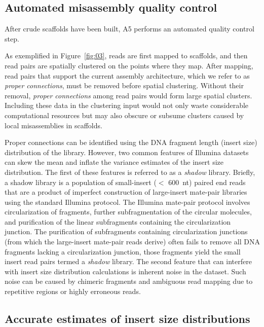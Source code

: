 \documentclass[10pt]{article}
\begin{document}
\subsection*{Automated misassembly quality control}\label{sec:qc}

After crude scaffolds have been built, A5 performs an automated quality control step.

As exemplified in Figure~\ref{fig:03}, reads are first mapped to scaffolds, and then read pairs are spatially clustered on the
points where they map. After mapping, read pairs that support the current assembly architecture, which we 
refer to as \emph{proper connections}, must be removed before spatial clustering. Without their removal, \emph{proper connections}
among read pairs would form large spatial clusters. Including these data in the clustering input would not only waste considerable 
computational resources but may also obscure or subsume clusters caused by local misassemblies in scaffolds. 


Proper connections can be identified using the DNA fragment length (insert size) distribution of the library. However, two common features of
Illumina datasets can skew the mean and inflate the variance estimates of the insert size distribution. The first of these features is referred 
to as a \emph{shadow} library. Briefly, a shadow library is a population of small-insert ($<$ 600~nt) paired end reads that are a product of 
imperfect construction of large-insert mate-pair libraries using the standard Illumina protocol. The Illumina mate-pair protocol involves 
circularization of fragments, further subfragmentation of the circular molecules, and purification of the linear subfragments containing the circularization junction. 
The purification of subfragments containing circularization junctions (from which the large-insert mate-pair reads derive) often fails to remove all 
DNA fragments lacking a circularization junction, those fragments yield the small insert read pairs termed a \emph{shadow} library. The second 
feature that can interfere with insert size distribution calculations is inherent noise in the dataset. Such noise can be caused by chimeric 
fragments and ambiguous read mapping due to repetitive regions or highly erroneous reads. 


\subsection*{Accurate estimates of insert size distributions}
\end{document}
